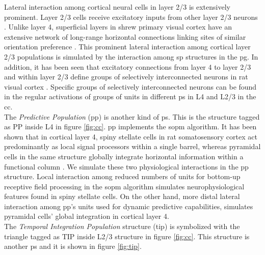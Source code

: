 \documentclass[11pt,a4paper]{article}
\begin{document}
Lateral interaction among cortical neural cells in layer 2/3 is extensively prominent.
Layer 2/3 cells receive excitatory inputs from other layer 2/3 neurons \cite{bannister05}.
Unlike layer 4, superficial layers in shrew primary visual cortex have
an extensive network of long-range horizontal connections linking
sites of similar orientation preference \cite{chisum03}.
This prominent lateral interaction among cortical layer 2/3 populations is simulated by
the interaction among \ac{sp} structures in the \ac{pg}.
In addition, it has been seen that excitatory connections from layer 4
to layer 2/3 and within layer 2/3 define
groups of selectively interconnected neurons in rat visual cortex \cite{yoshimura05}.
Specific groups of selectively interconnected neurons can be found
in the regular activations of groups of units in different
\ac{ps} in L4 and L2/3 in the \ac{cc}.\\

The \textit{Predictive Population} (\ac{pp}) is another kind of \ac{ps}.
This is the structure tagged as PP inside L4 in figure \ref{fig:cc}.
\ac{pp} implements the \ac{sopm} algorithm.
It has been shown that in cortical layer 4, spiny stellate cells in
rat somatosensory cortex act predominantly as local signal processors
within a single barrel, whereas pyramidal cells in the same structure
globally integrate horizontal information within a functional column
\cite{schubert03}.
We simulate these two physiological interactions in the \ac{pp}
structure.
Local interaction among reduced numbers of units for bottom-up
receptive field processing in the \ac{sopm} algorithm simulates
neurophysiological features found in spiny stellate cells.
On the other hand, more distal lateral interaction
among \ac{pp}'s units used for dynamic predictive capabilities,
simulates pyramidal cells' global integration in cortical layer 4.\\

The \textit{Temporal Integration Population} structure (\ac{tip}) is
symbolized with the triangle tagged as TIP inside L2/3 structure
in figure \ref{fig:cc}.
This structure is another \ac{ps} and it is shown in figure \ref{fig:tip}.\\
\end{document}
